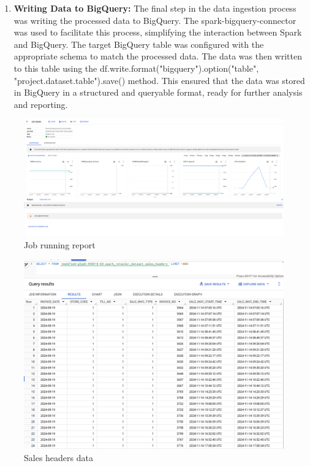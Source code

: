 \begin{enumerate}
    \item \textbf{Writing Data to BigQuery:} The final step in the data ingestion process was
        writing the processed data to BigQuery. The spark-bigquery-connector was used to facilitate
        this process, simplifying the interaction between Spark and BigQuery. The target BigQuery
        table was configured with the appropriate schema to match the processed data. The data was
        then written to this table using the df.write.format("bigquery").option("table",
        "project.dataset.table").save() method. This ensured that the data was stored in BigQuery in
        a structured and queryable format, ready for further analysis and reporting.
\end{enumerate}

\begin{figure}[htp]
    \centering
    \includegraphics[width=.8\linewidth]{images/data-proc-job.png}
    \caption{Job running report}
\end{figure}
\begin{figure}[htp]
    \centering
    \includegraphics[width=.8\linewidth]{images/data-from-spark.png}
    \caption{Sales headers data}
\end{figure}


